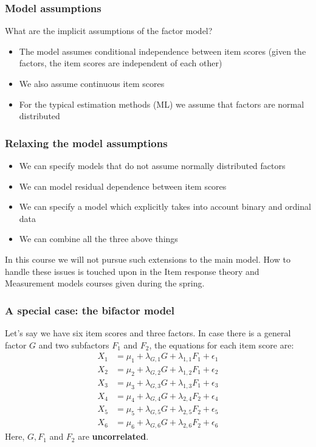 \documentclass[compress]{beamer}
\begin{document}
\begin{frame}[fragile]
\frametitle{Model assumptions}
What are the implicit assumptions of the factor model?
\begin{itemize}
\item The model assumes conditional independence between item scores (given the factors, the item scores are independent of each other)
\item We also assume continuous item scores
\item For the typical estimation methods (ML) we assume that factors are normal distributed
\end{itemize}
\end{frame}

\begin{frame}[fragile]
\frametitle{Relaxing the model assumptions}
\begin{itemize}
\item We can specify models that do not assume normally distributed factors
\item We can model residual dependence between item scores 
\item We can specify a model which explicitly takes into account binary and ordinal data
\item We can combine all the three above things
\end{itemize}
In this course we will not pursue such extensions to the main model. How to handle these issues is touched upon in the Item response theory and Measurement models courses given during the spring.
\end{frame}


\begin{frame}[fragile]
\frametitle{A special case: the bifactor model}
Let's say we have six item scores and three factors. In case there is a general factor $G$ and two subfactors $F_1$ and $F_2$, the equations for each item score are:
\begin{align*}
X_1 &= \mu_1 +\lambda_{G,1} G + \lambda_{1,1} F_1 + \epsilon_1\\
X_2 &= \mu_2 +\lambda_{G,2} G + \lambda_{1,2} F_1 + \epsilon_2\\
X_3 &= \mu_3 +\lambda_{G,3} G + \lambda_{1,3} F_1 + \epsilon_3\\
X_4 &= \mu_4 +\lambda_{G,4} G + \lambda_{2,4} F_2 + \epsilon_4\\
X_5 &= \mu_5 +\lambda_{G,5} G + \lambda_{2,5} F_2 + \epsilon_5\\
X_6 &= \mu_6 +\lambda_{G,6} G + \lambda_{2,6} F_2 + \epsilon_6
\end{align*}
Here, $G, F_1$ and $F_2$ are \textbf{uncorrelated}.
\end{frame}
\end{document}
